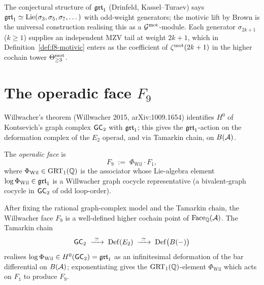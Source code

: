 \begin{remark}
The conjectural structure of $\mathfrak{grt}_1$ (Drinfeld, Kassel--Turaev)
says $\mathfrak{grt}_1 \simeq \mathrm{Lie}(\sigma_3,\sigma_5,\sigma_7,\dots)$
with odd-weight generators; the motivic lift by Brown is the
universal construction realising this as a
$\mathcal{G}^{\mathrm{mot}}$-module. Each generator $\sigma_{2k+1}$
($k\geq 1$) supplies an independent MZV tail at weight $2k+1$,
which in Definition~\ref{def:f8-motivic} enters as the
coefficient of $\zeta^{\mathrm{mot}}(2k+1)$ in the higher cochain tower
$\Theta_{\geq3}^{\mathrm{mot}}$.
\end{remark}

\section{The operadic face \texorpdfstring{$F_9$}{F9}}
\label{sec:f9-willwacher}

Willwacher's theorem (Willwacher 2015, arXiv:1009.1654) identifies
$H^0$ of Kontsevich's graph complex $\mathsf{GC}_2$ with $\mathfrak{grt}_1$; this
gives the $\mathfrak{grt}_1$-action on the deformation complex of the $E_2$
operad, and via Tamarkin chain, on $B(\mathcal{A})$.

\begin{definition}
The \emph{operadic face} is
\[
 F_9 \;:=\; \Phi_{\mathrm{Wil}}\cdot F_1,
\]
where $\Phi_{\mathrm{Wil}}\in\mathrm{GRT}_1(\mathbb{Q})$ is the associator
whose Lie-algebra element $\log\Phi_{\mathrm{Wil}}\in\mathfrak{grt}_1$ is a
Willwacher graph cocycle representative (a bivalent-graph cocycle
in $\mathsf{GC}_2$ of odd loop-order).
\end{definition}

\begin{theorem}
After fixing the rational graph-complex model and the Tamarkin chain,
the Willwacher face $F_9$ is a well-defined higher cochain point of
$\mathrm{Face}_{\mathbb Q}(\mathcal{A})$.
The Tamarkin chain
\[
 \mathsf{GC}_2 \;\xrightarrow{\ \simeq\ }\; \mathrm{Def}(E_2)
 \;\xrightarrow{\ \simeq\ }\; \mathrm{Def}\bigl(B(-)\bigr)
\]
realises $\log\Phi_{\mathrm{Wil}}\in H^0(\mathsf{GC}_2) = \mathfrak{grt}_1$ as an
infinitesimal deformation of the bar differential on $B(\mathcal{A})$;
exponentiating gives the $\mathrm{GRT}_1(\mathbb Q)$-element
$\Phi_{\mathrm{Wil}}$ which acts on $F_1$ to produce $F_9$.
\end{theorem}

